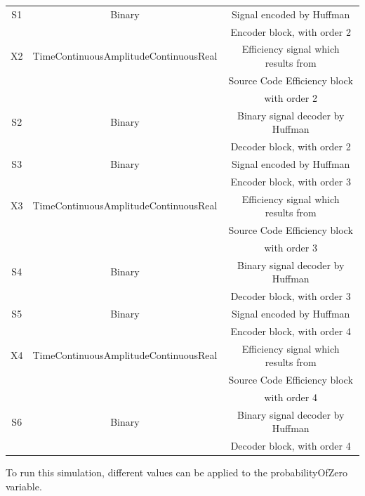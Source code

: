 \begin{refsection}
\begin{table}[h]
\begin{tabular}{|c|c|c|}
S1                                              &  Binary                          & Signal encoded by Huffman\\
 && Encoder block, with order 2\\
\hline
X2                                              &  TimeContinuousAmplitudeContinuousReal   &Efficiency signal which results from                 \\
 &&Source Code Efficiency block\\
 && with order 2\\
 \hline
S2                                              &  Binary                        & Binary signal decoder by Huffman\\
 &&  Decoder block, with order 2\\
\hline
S3                                              &  Binary    &Signal encoded by Huffman\\
 && Encoder block, with order 3\\
\hline
X3                                              &  TimeContinuousAmplitudeContinuousReal &   Efficiency signal which results from                 \\
 &&Source Code Efficiency block\\
 && with order 3\\
 \hline
S4                                              &  Binary                                   & Binary signal decoder by Huffman\\
 &&  Decoder block, with order 3\\
\hline
S5                                              &  Binary    &Signal encoded by Huffman\\
 && Encoder block, with order 4\\
\hline
X4                                              &  TimeContinuousAmplitudeContinuousReal &   Efficiency signal which results from                 \\
 &&Source Code Efficiency block\\
 && with order 4\\
 \hline
S6                                              &  Binary                                   & Binary signal decoder by Huffman\\
 &&  Decoder block, with order 4\\
\hline
\end{tabular}
\end{table}

To run this simulation, different values can be applied to the probabilityOfZero variable.


\clearpage
\end{refsection}
\cleardoublepage
